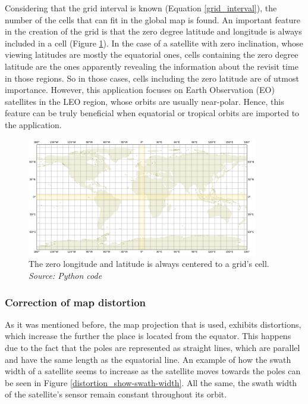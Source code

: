 Considering that the grid interval is known (Equation \ref{grid_interval}), the number of the cells that can fit in the global map is found. An important feature in the creation of the grid is that the zero degree latitude and longitude is always included in a cell (Figure \ref{map_projection_0covered}). In the case of a satellite with zero inclination, whose viewing latitudes are mostly the equatorial ones, cells containing the zero degree latitude are the ones apparently revealing the information about the revisit time in those regions. So in those cases, cells including the zero latitude are of utmost importance. However, this application focuses on Earth Observation (EO) satellites in the LEO region, whose orbits are usually near-polar. Hence, this feature can be truly beneficial when equatorial or tropical orbits are imported to the application.

\begin{figure}
\centering
\includegraphics[width=0.9\textwidth]{Images/map_projection_0covered.png}\caption{The zero longitude and latitude is always centered to a grid's cell. \textit{Source: Python code}}
\label{map_projection_0covered}
\end{figure}

\bigskip
\subsubsection{Correction of map distortion}
\label{Correction of map distortion}
\bigskip

As it was mentioned before, the map projection that is used, exhibits distortions, which increase the further the place is located from the equator. This happens due to the fact that the poles are represented as straight lines, which are parallel and have the same length as the equatorial line. An example of how the swath width of a satellite seems to increase as the satellite moves towards the poles can be seen in Figure \ref{distortion_show-swath-width}. All the same, the swath width of the satellite's sensor remain constant throughout its orbit.

